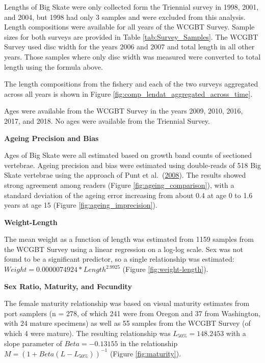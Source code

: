 \documentclass[12pt,]{article}
\begin{document}
Lengths of Big Skate were only collected form the Triennial survey in
1998, 2001, and 2004, but 1998 had only 3 samples and were excluded from
this analysis. Length compositions were available for all years of the
WCGBT Survey. Sample sizes for both surveys are provided in Table
\ref{tab:Survey_Samples}. The WCGBT Survey used disc width for the years
2006 and 2007 and total length in all other years. Those samples where
only disc width was measured were converted to total length using the
formula above.

The length compositions from the fishery and each of the two surveys
aggregated across all years is shown in Figure
\ref{fig:comp_lendat_aggregated_across_time}.

Ages were available from the WCGBT Survey in the years 2009, 2010, 2016,
2017, and 2018. No ages were available from the Triennial Survey.

\vspace{.5cm}

\textbf{Ageing Precision and Bias}

Ages of Big Skate were all estimated based on growth band counts of
sectioned vertebrae. Ageing precision and bias were estimated using
double-reads of 518 Big Skate vertebrae using the approach of Punt et
al.~(\protect\hyperlink{ref-Punt2008}{2008}). The results showed strong
agreement among readers (Figure \ref{fig:ageing_comparison}), with a
standard deviation of the ageing error increasing from about 0.4 at age
0 to 1.6 years at age 15 (Figure \ref{fig:ageing_imprecision}).

\vspace{.5cm}

\textbf{Weight-Length}

The mean weight as a function of length was estimated from 1159 samples
from the WCGBT Survey using a linear regression on a log-log scale. Sex
was not found to be a significant predictor, so a single relationship
was estimated: \(Weight = 0.0000074924 * Length ^ 2.9925\) (Figure
\ref{fig:weight-length}).

\vspace{.5cm}

\textbf{Sex Ratio, Maturity, and Fecundity}

The female maturity relationship was based on visual maturity estimates
from port samplers (n = 278, of which 241 were from Oregon and 37 from
Washington, with 24 mature specimens) as well as 55 samples from the
WCGBT Survey (of which 4 were mature). The resulting relationship was
\(L_{50\%} = 148.2453\) with a slope parameter of \(Beta = -0.13155\) in
the relationship \(M = (1 + Beta(L - L_{50\%}))^{-1}\) (Figure
\ref{fig:maturity}).
\end{document}
